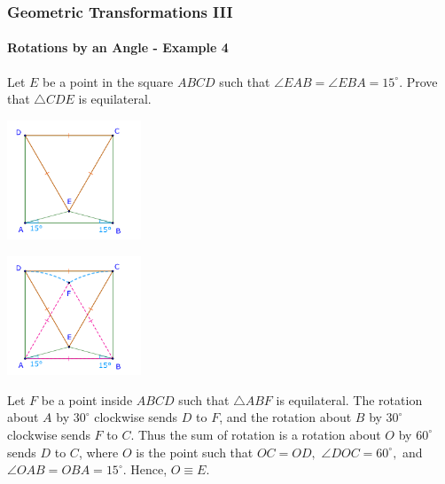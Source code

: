 \documentclass[8pt,xcolor=table,dvipsnames]{beamer}
\newcommand{\dg}{^\circ}
\begin{document}
\begin{frame}[t]
    \frametitle{Geometric Transformations III}
    \framesubtitle{Rotations by an Angle - Example 4}
    \begin{example}
        Let $E$ be a point in the square $ABCD$ such that $\angle EAB = \angle EBA = 15\dg.$
        Prove that $\triangle CDE$ is equilateral.
    \end{example}
    \begin{overprint}
        \begin{center}
            \includegraphics[width=4cm]{./svg/pdf/rotation-11-2.pdf}
        \end{center}
        \begin{center}
            \includegraphics[width=4cm]{./svg/pdf/rotation-11.pdf}
        \end{center}
    \end{overprint}
    Let $F$ be a point inside $ABCD$ such that $\triangle ABF$ is equilateral.
    \bigbreak
    The rotation about $A$ by $30\dg$ clockwise sends $D$ to $F$,
    and the rotation about $B$ by $30\dg$ clockwise sends $F$ to $C$.
    \bigbreak
    Thus the sum of rotation is a rotation about $O$ by $60\dg$ sends $D$ to $C$, where
    $O$ is the point such that $OC = OD,$ $\angle DOC = 60\dg,$ and $\angle OAB = OBA = 15\dg.$
    Hence, $O \equiv E.$
\end{frame}
\end{document}

